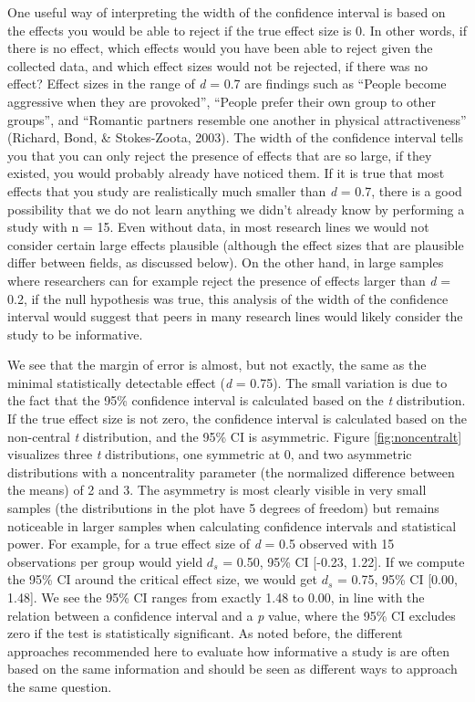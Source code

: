 \documentclass[
  english,
  ,jou, a4paper,floatsintext]{apa6}
\begin{document}
One useful way of interpreting the width of the confidence interval is based on the effects you would be able to reject if the true effect size is 0. In other words, if there is no effect, which effects would you have been able to reject given the collected data, and which effect sizes would not be rejected, if there was no effect? Effect sizes in the range of \emph{d} = 0.7 are findings such as ``People become aggressive when they are provoked'', ``People prefer their own group to other groups'', and ``Romantic partners resemble one another in physical attractiveness'' (Richard, Bond, \& Stokes-Zoota, 2003). The width of the confidence interval tells you that you can only reject the presence of effects that are so large, if they existed, you would probably already have noticed them. If it is true that most effects that you study are realistically much smaller than \emph{d} = 0.7, there is a good possibility that we do not learn anything we didn't already know by performing a study with n = 15. Even without data, in most research lines we would not consider certain large effects plausible (although the effect sizes that are plausible differ between fields, as discussed below). On the other hand, in large samples where researchers can for example reject the presence of effects larger than \emph{d} = 0.2, if the null hypothesis was true, this analysis of the width of the confidence interval would suggest that peers in many research lines would likely consider the study to be informative.

We see that the margin of error is almost, but not exactly, the same as the minimal statistically detectable effect (\emph{d} = 0.75). The small variation is due to the fact that the 95\% confidence interval is calculated based on the \emph{t} distribution. If the true effect size is not zero, the confidence interval is calculated based on the non-central \emph{t} distribution, and the 95\% CI is asymmetric. Figure \ref{fig:noncentralt} visualizes three \emph{t} distributions, one symmetric at 0, and two asymmetric distributions with a noncentrality parameter (the normalized difference between the means) of 2 and 3. The asymmetry is most clearly visible in very small samples (the distributions in the plot have 5 degrees of freedom) but remains noticeable in larger samples when calculating confidence intervals and statistical power. For example, for a true effect size of \emph{d} = 0.5 observed with 15 observations per group would yield \(d_s\) = 0.50, 95\% CI {[}-0.23, 1.22{]}. If we compute the 95\% CI around the critical effect size, we would get \(d_s\) = 0.75, 95\% CI {[}0.00, 1.48{]}. We see the 95\% CI ranges from exactly 1.48 to 0.00, in line with the relation between a confidence interval and a \emph{p} value, where the 95\% CI excludes zero if the test is statistically significant. As noted before, the different approaches recommended here to evaluate how informative a study is are often based on the same information and should be seen as different ways to approach the same question.
\end{document}
